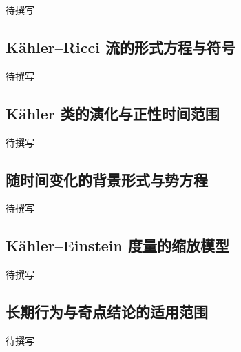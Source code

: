 
% 
% 
% 
% 


待撰写

\subsection{Kähler–Ricci 流的形式方程与符号}
\label{g4:subsec:3106:01}
待撰写

\subsection{Kähler 类的演化与正性时间范围}
\label{g4:subsec:3106:02}
待撰写

\subsection{随时间变化的背景形式与势方程}
\label{g4:subsec:3106:03}
待撰写

\subsection{Kähler–Einstein 度量的缩放模型}
\label{g4:subsec:3106:04}
待撰写

\subsection{长期行为与奇点结论的适用范围}
\label{g4:subsec:3106:05}
待撰写

